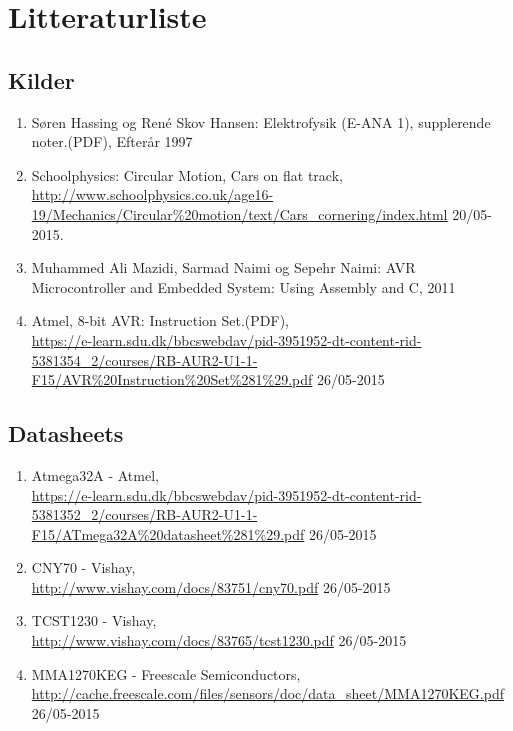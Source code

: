 \section{Litteraturliste}
\subsection{Kilder}
\begin{enumerate}
\item Søren Hassing og René Skov Hansen: Elektrofysik (E-ANA 1), supplerende noter.(PDF), Efterår 1997
\item Schoolphysics: Circular Motion, Cars on flat track, \\
\url{http://www.schoolphysics.co.uk/age16-19/Mechanics/Circular\%20motion/text/Cars_cornering/index.html} 20/05-2015.
\item Muhammed Ali Mazidi, Sarmad Naimi og Sepehr Naimi: AVR Microcontroller and Embedded System: Using Assembly and C, 2011
\item Atmel, 8-bit AVR: Instruction Set.(PDF), \\
\url{https://e-learn.sdu.dk/bbcswebdav/pid-3951952-dt-content-rid-5381354_2/courses/RB-AUR2-U1-1-F15/AVR\%20Instruction\%20Set\%281\%29.pdf} 26/05-2015
\end{enumerate}

\subsection{Datasheets}
\begin{enumerate}
\item Atmega32A - Atmel, \\
\url{https://e-learn.sdu.dk/bbcswebdav/pid-3951952-dt-content-rid-5381352_2/courses/RB-AUR2-U1-1-F15/ATmega32A\%20datasheet\%281\%29.pdf} 26/05-2015
\item CNY70 - Vishay, \\
\url{http://www.vishay.com/docs/83751/cny70.pdf} 26/05-2015
\item TCST1230 - Vishay, \\
\url{http://www.vishay.com/docs/83765/tcst1230.pdf} 26/05-2015
\item MMA1270KEG - Freescale Semiconductors, \\
\url{http://cache.freescale.com/files/sensors/doc/data_sheet/MMA1270KEG.pdf} 26/05-2015
\end{enumerate}
